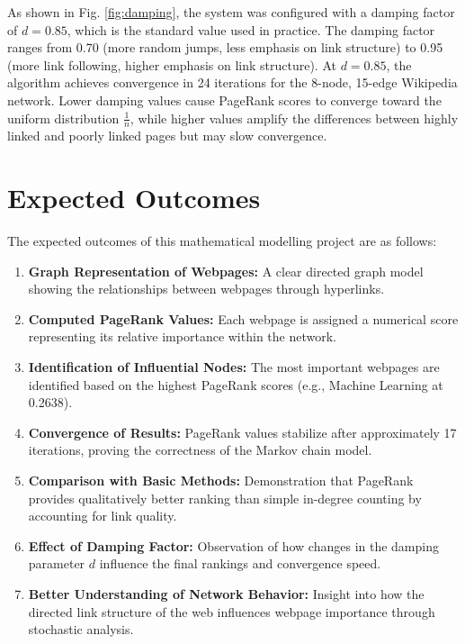 \documentclass[conference]{IEEEtran}
\begin{document}
As shown in Fig. \ref{fig:damping}, the system was configured with a damping factor of $d = 0.85$, which is the standard value used in practice. The damping factor ranges from 0.70 (more random jumps, less emphasis on link structure) to 0.95 (more link following, higher emphasis on link structure). At $d = 0.85$, the algorithm achieves convergence in 24 iterations for the 8-node, 15-edge Wikipedia network. Lower damping values cause PageRank scores to converge toward the uniform distribution $\frac{1}{n}$, while higher values amplify the differences between highly linked and poorly linked pages but may slow convergence.

\section{Expected Outcomes}
The expected outcomes of this mathematical modelling project are as follows:
\begin{enumerate}
    \item \textbf{Graph Representation of Webpages:} A clear directed graph model showing the relationships between webpages through hyperlinks.
    \item \textbf{Computed PageRank Values:} Each webpage is assigned a numerical score representing its relative importance within the network.
    \item \textbf{Identification of Influential Nodes:} The most important webpages are identified based on the highest PageRank scores (e.g., Machine Learning at 0.2638).
    \item \textbf{Convergence of Results:} PageRank values stabilize after approximately 17 iterations, proving the correctness of the Markov chain model.
    \item \textbf{Comparison with Basic Methods:} Demonstration that PageRank provides qualitatively better ranking than simple in-degree counting by accounting for link quality.
    \item \textbf{Effect of Damping Factor:} Observation of how changes in the damping parameter $d$ influence the final rankings and convergence speed.
    \item \textbf{Better Understanding of Network Behavior:} Insight into how the directed link structure of the web influences webpage importance through stochastic analysis.
\end{enumerate}
\end{document}
